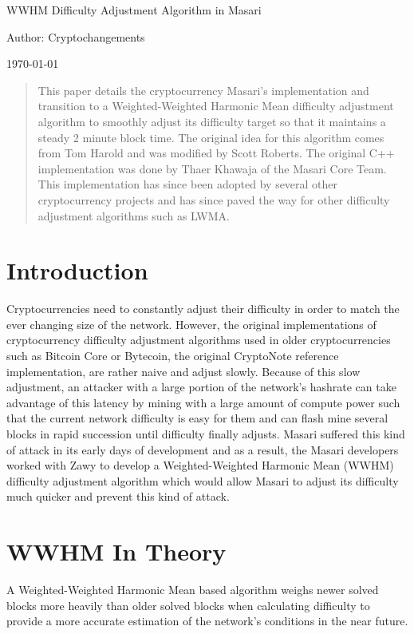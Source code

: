 \documentclass{article}
\author{cryptochangements}
\date{\today}
\begin{document}
\noindent\Large WWHM Difficulty Adjustment Algorithm in Masari

\small\noindent Author: Cryptochangements

\noindent\today
\begin{abstract}
This paper details the
cryptocurrency Masari's implementation
and transition to a Weighted-Weighted
Harmonic Mean difficulty adjustment
algorithm to smoothly adjust its difficulty
target so that it maintains a steady 2 minute
block time. The original idea for this
algorithm comes from Tom Harold and
was modified by Scott Roberts. The original C++
implementation was done by Thaer
Khawaja of the Masari Core Team. This
implementation has since been adopted
by several other cryptocurrency projects
and has since paved the way for other
difficulty adjustment algorithms such as
LWMA.
\end{abstract}

\section{Introduction}
Cryptocurrencies need to
constantly adjust their difficulty in order to match the ever changing size of the
network. However, the original
implementations of cryptocurrency
difficulty adjustment algorithms used in
older cryptocurrencies such as Bitcoin Core or Bytecoin,
the original CryptoNote reference
implementation, are rather naive and
adjust slowly. Because of this slow
adjustment, an attacker with a large
portion of the network's hashrate can take
advantage of this latency by mining with a
large amount of compute power such that
the current network difficulty is easy for
them and can flash mine several blocks in
rapid succession until difficulty finally
adjusts. Masari suffered this kind of
attack in its early days of development
and as a result, the Masari developers
worked with Zawy to develop a Weighted-Weighted Harmonic Mean (WWHM)
difficulty adjustment algorithm which
would allow Masari to adjust its difficulty
much quicker and prevent this kind of
attack.

\section{WWHM In Theory}
A Weighted-Weighted
Harmonic Mean based algorithm weighs
newer solved blocks more heavily than
older solved blocks when calculating
difficulty to provide a more accurate
estimation of the network's conditions in
the near future.
\end{document}
